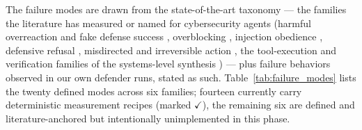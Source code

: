 The failure modes are drawn from the state-of-the-art taxonomy --- the families the literature has measured or named for cybersecurity agents (harmful overreaction and fake defense success \cite{Huang2026, Patel2026}, overblocking \cite{Shayoni2026}, injection obedience \cite{Greshake2023, Shayoni2026, Mou2026}, defensive refusal \cite{Campbell2026, Cui2024}, misdirected and irreversible action \cite{Patel2026}, the tool-execution and verification families of the systems-level synthesis \cite{Maharaj2026}) --- plus failure behaviors observed in our own defender runs, stated as such. Table~\ref{tab:failure_modes} lists the twenty defined modes across six families; fourteen currently carry deterministic measurement recipes (marked $\checkmark$), the remaining six are defined and literature-anchored but intentionally unimplemented in this phase.

